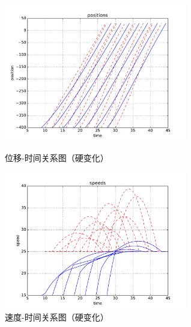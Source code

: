 \begin{figure}[htbp]
\begin{minipage}{0.48\textwidth}
  \centering
  \includegraphics[height=6cm]{figures/sim_case3/posi.pdf}
  \caption{位移-时间关系图（硬变化）}
  \label{fig:case3:posi}
\end{minipage}\hfill
\begin{minipage}{0.48\textwidth}
  \centering
  \includegraphics[height=6cm]{figures/sim_case3/speed.pdf}
  \caption{速度-时间关系图（硬变化）}
  \label{fig:case3:speed}
\end{minipage}
\end{figure}
